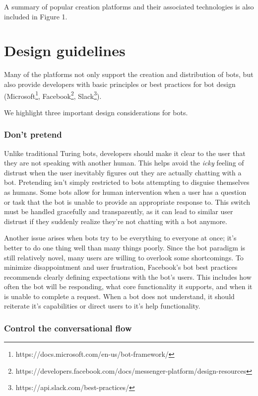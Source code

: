 \documentclass{sig-alternate}
\begin{document}
	A summary of popular creation platforms and their associated technologies is also included in Figure 1.

	\section{Design guidelines}

	Many of the platforms not only support the creation and distribution of bots, but also provide developers with basic principles or best practices for bot design (Microsoft\footnote{https://docs.microsoft.com/en-us/bot-framework/}, Facebook\footnote{https://developers.facebook.com/docs/messenger-platform/design-resources}, Slack\footnote{https://api.slack.com/best-practices/}).

	We highlight three important design considerations for bots.

	\subsubsection{Don't pretend}

	Unlike traditional Turing bots, developers should make it clear to the user that they are not speaking with another human. This helps avoid the \emph{icky} feeling of distrust when the user inevitably figures out they are actually chatting with a bot.  
	Pretending isn't simply restricted to bots attempting to disguise themselves as humans. Some bots allow for human intervention when a user has a question or task that the bot is unable to provide an appropriate response to.  This switch must be handled gracefully and transparently, as it can lead to similar user distrust if they suddenly realize they're not chatting with a bot anymore.

	Another issue arises when bots try to be everything to everyone at once; it's better to do one thing well than many things poorly. Since the bot paradigm is still relatively novel, many users are willing to overlook some shortcomings.  To minimize disappointment and user frustration, Facebook's bot best practices recommends clearly defining expectations with the bot's users. This includes how often the bot will be responding, what core functionality it supports, and when it is unable to complete a request.  When a bot does not understand, it should reiterate it's capabilities or direct users to it's help functionality.


	\subsubsection{Control the conversational flow}
\end{document}
